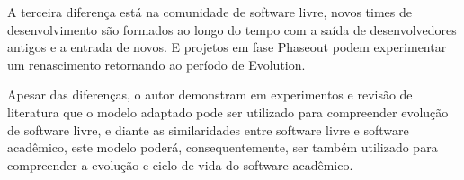 A terceira diferença está na comunidade de software livre,
novos times de desenvolvimento são formados ao longo do tempo
com a saída de desenvolvedores antigos e a entrada de novos.
E projetos em fase Phaseout podem experimentar um renascimento
retornando ao período de Evolution.

Apesar das diferenças, o autor  demonstram em experimentos e
revisão de literatura que o modelo adaptado pode ser utilizado para
compreender evolução de software livre, e diante as similaridades entre software livre
e software acadêmico, este modelo poderá, consequentemente, ser também
utilizado para compreender a evolução e ciclo de vida do software acadêmico.
